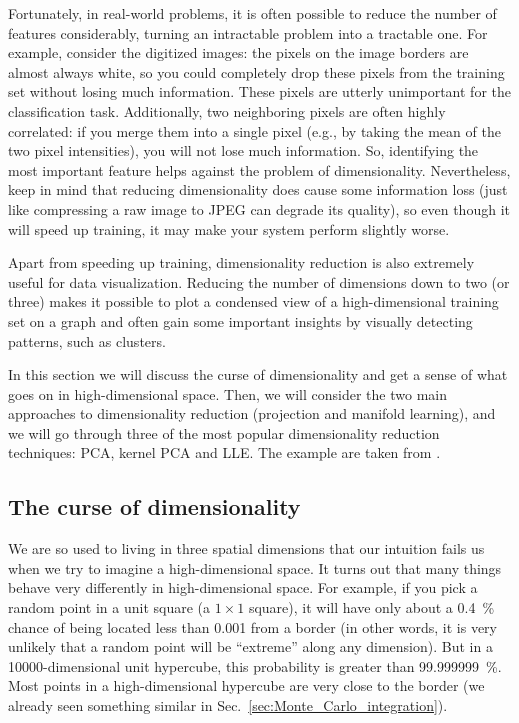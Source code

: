Fortunately, in real-world problems, it is often possible to reduce the number of features considerably, turning an intractable problem into a tractable one. For example, consider the digitized images: the pixels on the image borders are almost always white, so you could completely drop these pixels from the training set without losing much information. These pixels are utterly unimportant for the classification task. Additionally, two neighboring pixels are often highly correlated: if you merge them into a single pixel (e.g., by taking the mean of the two pixel intensities), you will not lose much information. So, identifying the most important feature helps against the problem of dimensionality. Nevertheless, keep in mind that reducing dimensionality does cause some information loss (just like compressing a raw image to JPEG can degrade its quality), so even though it will speed up training, it may make your system perform slightly worse.

Apart from speeding up training, dimensionality reduction is also extremely useful for data visualization. Reducing the number of dimensions down to two (or three) makes it possible to plot a condensed view of a high-dimensional training set on a graph and often gain some important insights by visually detecting patterns, such as clusters.

In this section we will discuss the curse of dimensionality and get a sense of what goes on in high-dimensional space. Then, we will consider the two main approaches to dimensionality reduction (projection and manifold learning), and we will go through three of the most popular dimensionality reduction techniques: PCA, kernel PCA and LLE. The example are taken from .
\subsection{The curse of dimensionality}
We are so used to living in three spatial dimensions that our intuition fails us when we try to imagine a high-dimensional space. It turns out that many things behave very differently in high-dimensional space. For example, if you pick a random point in a unit square (a $1\times1$ square), it will have only about a \SI{0.4}{\percent} chance of being located less than \num{0.001} from a border (in other words, it is very unlikely that a random point will be ``extreme'' along any dimension). But in a \num{10000}-dimensional unit hypercube, this probability is greater than \SI{99.999999}{\percent}. Most points in a high-dimensional hypercube are very close to the border (we already seen something similar in Sec.~\ref{sec:Monte_Carlo_integration}).

